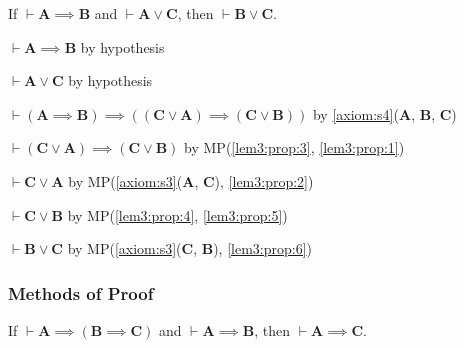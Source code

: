 \documentclass{amsart}%
\newcommand\metavariable[1]{\boldsymbol{#1}}
\begin{document}
\begin{lemma}\label{lem3:prop}
If $\vdash\metavariable{A}\implies\metavariable{B}$
and $\vdash\metavariable{A}\lor\metavariable{C}$,
then $\vdash\metavariable{B}\lor\metavariable{C}$.
\end{lemma}
\begin{pf}
\item\label{lem3:prop:1} $\vdash\metavariable{A}\implies\metavariable{B}$ by hypothesis
\item\label{lem3:prop:2} $\vdash\metavariable{A}\lor\metavariable{C}$ by hypothesis
\item\label{lem3:prop:3} $\vdash(\metavariable{A}\implies\metavariable{B})\implies((\metavariable{C}\lor\metavariable{A})\implies(\metavariable{C}\lor\metavariable{B}))$
  by \ref{axiom:s4}($\metavariable{A}$, $\metavariable{B}$, $\metavariable{C}$)
\item\label{lem3:prop:4} $\vdash(\metavariable{C}\lor\metavariable{A})\implies(\metavariable{C}\lor\metavariable{B})$
  by MP(\ref{lem3:prop:3}, \ref{lem3:prop:1})
\item\label{lem3:prop:5} $\vdash\metavariable{C}\lor\metavariable{A}$ by MP(\ref{axiom:s3}($\metavariable{A}$, $\metavariable{C}$), \ref{lem3:prop:2})
\item\label{lem3:prop:6} $\vdash\metavariable{C}\lor\metavariable{B}$
  by MP(\ref{lem3:prop:4}, \ref{lem3:prop:5})
\item\label{lem3:prop:7} $\vdash\metavariable{B}\lor\metavariable{C}$
  by MP(\ref{axiom:s3}($\metavariable{C}$, $\metavariable{B}$), \ref{lem3:prop:6})
\end{pf}



\subsubsection{Methods of Proof}

\begin{lemma}\label{lm:prop:hs}
If $\vdash\metavariable{A}\implies(\metavariable{B}\implies\metavariable{C})$
and $\vdash\metavariable{A}\implies\metavariable{B}$,
then $\vdash\metavariable{A}\implies\metavariable{C}$.
\end{lemma}
\end{document}
